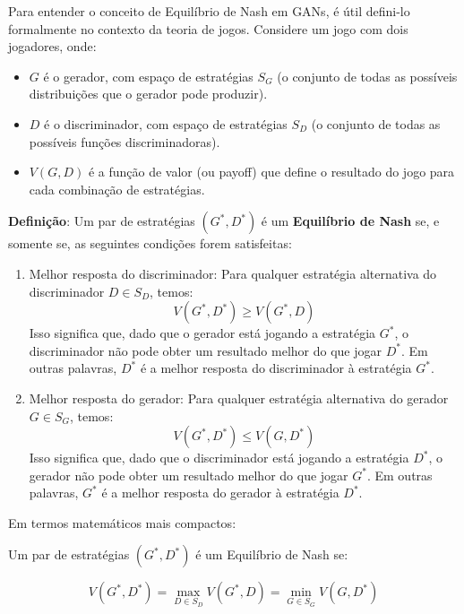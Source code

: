 \documentclass{tufte-handout}
\begin{document}
\begin{thm}

Para entender o conceito de Equilíbrio de Nash em GANs, é útil defini-lo formalmente no contexto da teoria de jogos. Considere um jogo com dois jogadores, onde:

\begin{itemize}
    \item $G$ é o gerador, com espaço de estratégias $S_G$ (o conjunto de todas as possíveis distribuições que o gerador pode produzir).
    \item $D$ é o discriminador, com espaço de estratégias $S_D$ (o conjunto de todas as possíveis funções discriminadoras).
    \item $V(G, D)$ é a função de valor (ou payoff) que define o resultado do jogo para cada combinação de estratégias.
\end{itemize}

\textbf{Definição}: Um par de estratégias $(G^*, D^*)$ é um \textbf{Equilíbrio de Nash} se, e somente se, as seguintes condições forem satisfeitas:
\begin{enumerate}
    \item Melhor resposta do discriminador: Para qualquer estratégia alternativa do discriminador $D \in S_D$, temos:
    \begin{equation}
    V(G^*, D^*) \geq V(G^*, D)
    \end{equation}
    Isso significa que, dado que o gerador está jogando a estratégia $G^*$, o discriminador não pode obter um resultado melhor do que jogar $D^*$. Em outras palavras, $D^*$ é a melhor resposta do discriminador à estratégia $G^*$.
    \item Melhor resposta do gerador: Para qualquer estratégia alternativa do gerador $G \in S_G$, temos:
    \begin{equation}
    V(G^*, D^*) \leq V(G, D^*)
    \end{equation}
    Isso significa que, dado que o discriminador está jogando a estratégia $D^*$, o gerador não pode obter um resultado melhor do que jogar $G^*$. Em outras palavras, $G^*$ é a melhor resposta do gerador à estratégia $D^*$.
\end{enumerate}
    
Em termos matemáticos mais compactos:

Um par de estratégias $(G^*, D^*)$ é um Equilíbrio de Nash se:

\begin{equation}
V(G^*, D^*) = \max_{D \in S_D} V(G^*, D) = \min_{G \in S_G} V(G, D^*)
\end{equation}


\end{thm}
\end{document}
